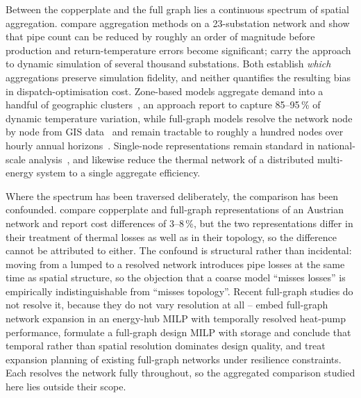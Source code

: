 Between the copperplate and the full graph lies a continuous spectrum of spatial
aggregation. \citet{Larsen2004} compare aggregation methods on a 23-substation network
and show that pipe count can be reduced by roughly an order of magnitude before
production and return-temperature errors become significant; \citet{Falay2020} carry the
approach to dynamic simulation of several thousand substations. Both establish
\emph{which} aggregations preserve simulation fidelity, and neither quantifies the
resulting bias in dispatch-optimisation cost. Zone-based models aggregate demand into a
handful of geographic clusters~\cite{Wirtz2020}, an approach \citet{Buenning2020} report
to capture 85--95\,\% of dynamic temperature variation, while full-graph models resolve
the network node by node from GIS data~\cite{vanderHeijde2017} and remain tractable to
roughly a hundred nodes over hourly annual horizons~\cite{Giraud2015}. Single-node
representations remain standard in national-scale
analysis~\cite{Connolly2014_EnergyPLAN}, and \citet{Gabrielli2018} likewise reduce the
thermal network of a distributed multi-energy system to a single aggregate efficiency.

Where the spectrum has been traversed deliberately, the comparison has been confounded.
\citet{Leitner2019} compare copperplate and full-graph representations of an Austrian
network and report cost differences of 3--8\,\%, but the two representations differ in
their treatment of thermal losses as well as in their topology, so the difference cannot
be attributed to either. The confound is structural rather than incidental: moving from a
lumped to a resolved network introduces pipe losses at the same time as spatial
structure, so the objection that a coarse model ``misses losses'' is empirically
indistinguishable from ``misses topology''. Recent full-graph studies do not resolve it,
because they do not vary resolution at all -- \citet{Trentmann2026} embed full-graph
network expansion in an energy-hub MILP with temporally resolved heat-pump performance,
\citet{Ceruti2025} formulate a full-graph design MILP with storage and conclude that
temporal rather than spatial resolution dominates design quality, and
\citet{Vieth2026} treat expansion planning of existing full-graph networks under
resilience constraints. Each resolves the network fully throughout, so the aggregated
comparison studied here lies outside their scope.

